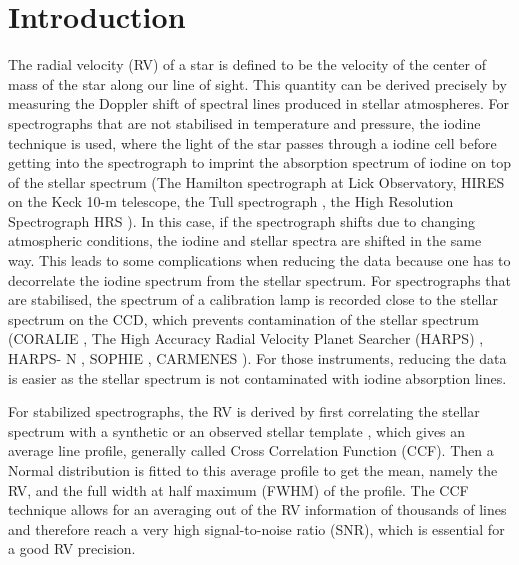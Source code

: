 \documentclass[11pt, oneside]{article}
\begin{document}


\section{Introduction}
\label{intro}

The radial velocity (RV) of a star is defined to be the velocity of the center of mass of the star along our line of sight. This quantity can be derived precisely by measuring the Doppler shift of spectral lines produced in stellar atmospheres. For spectrographs that are not stabilised in temperature and pressure, the iodine technique is used, where the light of the star passes through a iodine cell before getting into the spectrograph to imprint the absorption spectrum of iodine on top of the stellar spectrum (The Hamilton spectrograph \citep{Vogt1987} at Lick Observatory, HIRES \citep{Vogt1994} on the Keck 10-m telescope, the Tull spectrograph  \citep{Tull1995}, the High Resolution Spectrograph HRS  \citep{Tull1998}). In this case, if the spectrograph shifts due to changing atmospheric conditions, the iodine and stellar spectra are shifted in the same way. This leads to some complications when reducing the data because one has to decorrelate the iodine spectrum from the stellar spectrum. For spectrographs that are stabilised, the spectrum of a calibration lamp is recorded close to the stellar spectrum on the CCD, which prevents contamination of the stellar spectrum (CORALIE \citep{Queloz-2000a}, The High Accuracy Radial Velocity Planet Searcher (HARPS) \citep{Mayor-2003}, HARPS- N \citep{Cosentino-2012}, SOPHIE \citep{Bouchy:2013aa}, CARMENES \citep{Quirrenbach:2014aa}). For those instruments, reducing the data is easier as the stellar spectrum is not contaminated with iodine absorption lines.

For stabilized spectrographs, the RV is derived by first correlating the stellar spectrum with a synthetic \citep[][]{Baranne-1996,Pepe-2002a} or an observed stellar template \citep[][]{Anglada-Escude-2012}, which gives an average line profile, generally called Cross Correlation Function (CCF). Then a Normal distribution is fitted to this average profile to get the mean, namely the RV, and the full width at half maximum (FWHM) of the profile. The CCF technique allows for an averaging out of the RV information of thousands of lines and therefore reach a very high signal-to-noise ratio (SNR), which is essential for a good RV precision.
\end{document}
